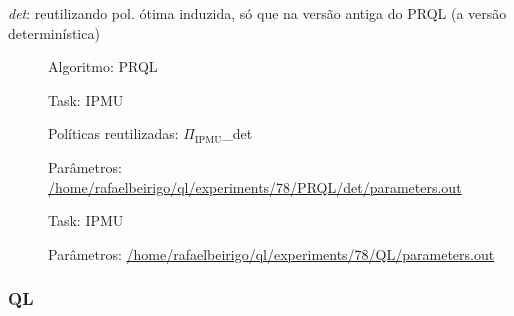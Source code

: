 \documentclass[11pt]{article}
\begin{document}
\begin{description}

\item[\emph{det}: reutilizando pol. ótima induzida, só que na versão antiga do PRQL (a versão determinística)]\label{sec-12.4.1.3}


\begin{description}

\item[Algoritmo: PRQL]\label{sec-12.4.1.3.1}


\end{description}
\begin{description}

\item[Task: IPMU]\label{sec-12.4.1.3.2}


\end{description}
\begin{description}

\item[Políticas reutilizadas: $\Pi$$_{\mathrm{IPMU}}$\_{}det]\label{sec-12.4.1.3.3}


\end{description}
\begin{description}

\item[Parâmetros: \href{file:///home/rafaelbeirigo/ql/experiments/78/PRQL/det/parameters.out}{/home/rafaelbeirigo/ql/experiments/78/PRQL/det/parameters.out}]\label{sec-12.4.1.3.4}



\end{description}
\begin{description}

\item[Task: IPMU]\label{sec-12.4.2.1}


\end{description}
\begin{description}

\item[Parâmetros: \href{file:///home/rafaelbeirigo/ql/experiments/78/QL/parameters.out}{/home/rafaelbeirigo/ql/experiments/78/QL/parameters.out}]\label{sec-12.4.2.2}


\end{description}
\end{description}
\subsubsection{QL}
\label{sec-12.4.2}
\end{document}
